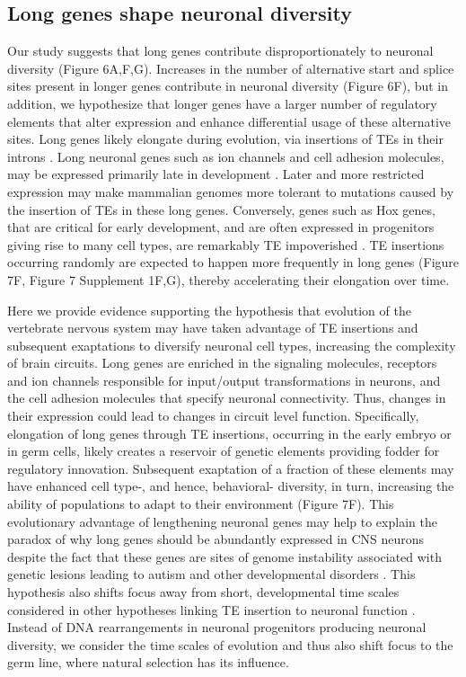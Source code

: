 \subsection{Long genes shape neuronal diversity}
Our study suggests that long genes contribute disproportionately to neuronal diversity (Figure 6A,F,G). Increases in the number of alternative start and splice sites present in longer genes contribute in neuronal diversity (Figure 6F), but in addition, we hypothesize that longer genes have a larger number of regulatory elements that alter expression and enhance differential usage of these alternative sites. Long genes likely elongate during evolution, via insertions of TEs in their introns \citep[Figure 7A,B;][]{Sela_2007,Grishkevich_2014}. Long neuronal genes such as ion channels and cell adhesion molecules, may be expressed primarily late in development \citep{Okaty_2009}. Later and more restricted expression may make mammalian genomes more tolerant to mutations caused by the insertion of TEs in these long genes. Conversely, genes such as Hox genes, that are critical for early development, and are often expressed in progenitors giving rise to many cell types, are remarkably TE impoverished \citep{Chinwalla_2002,Simons_2005}. TE insertions occurring randomly are expected to happen more frequently in long genes (Figure 7F, Figure 7 Supplement 1F,G), thereby accelerating their elongation over time. %

Here we provide evidence supporting the hypothesis that evolution of the vertebrate nervous system may have taken advantage of TE insertions and subsequent exaptations to diversify neuronal cell types, increasing the complexity of brain circuits. Long genes are enriched in the signaling molecules, receptors and ion channels responsible for input/output transformations in neurons, and the cell adhesion molecules that specify neuronal connectivity. Thus, changes in their expression could lead to changes in circuit level function. Specifically, elongation of long genes through TE insertions, occurring in the early embryo or in germ cells, likely creates a reservoir of genetic elements providing fodder for regulatory innovation. Subsequent exaptation of a fraction of these elements may have enhanced cell type-, and hence, behavioral- diversity, in turn, increasing the ability of populations to adapt to their environment (Figure 7F). This evolutionary advantage of lengthening neuronal genes may help to explain the paradox of why long genes should be abundantly expressed in CNS neurons despite the fact that these genes are sites of genome instability associated with genetic lesions leading to autism and other developmental disorders \citep{Wei_2016}. This hypothesis also shifts focus away from short, developmental time scales considered in other hypotheses linking TE insertion to neuronal function \citep{Muotri_2005,Richardson_2014,Perrat_2013}. Instead of DNA rearrangements in neuronal progenitors producing neuronal diversity, we consider the time scales of evolution and thus also shift focus to the germ line, where natural selection has its influence. 

